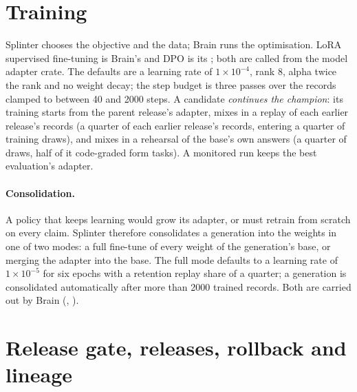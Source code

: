 
\section{Training}\label{sec:training}

Splinter chooses the objective and the data; Brain runs the optimisation. LoRA
supervised fine-tuning is Brain's  and DPO is its
; both are called from the model adapter crate. The
defaults are a learning rate of $1\times10^{-4}$, rank 8, alpha twice the rank and no
weight decay; the step budget is three passes over the records clamped to between
40 and 2000 steps. A candidate \emph{continues the champion}: its training starts
from the parent release's adapter, mixes in a replay of each earlier release's
records (a quarter of each earlier release's records, entering a quarter of training draws), and mixes in a rehearsal of the base's own
answers (a quarter of draws, half of it code-graded form tasks). A monitored run
keeps the best evaluation's adapter.

\paragraph{Consolidation.} A policy that keeps learning would grow its adapter, or must
retrain from scratch on every claim. Splinter therefore consolidates a generation into
the weights in one of two modes: a full fine-tune of every weight of the generation's
base, or merging the adapter into the base. The full mode defaults to a learning
rate of $1\times10^{-5}$ for six epochs with a retention replay share of a quarter; a
generation is consolidated automatically after more than 2000 trained records.
Both are carried out by Brain (, ).

\section{Release gate, releases, rollback and lineage}\label{sec:gate}


